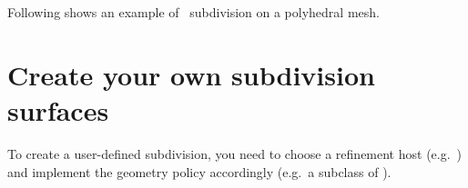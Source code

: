 Following shows an example of \DS\ subdivision on a polyhedral mesh.

\section{Create your own subdivision surfaces}
To create a user-defined subdivision, you need to choose a refinement host 
(e.g.~) and implement the
geometry policy accordingly (e.g.~a subclass of ). 

